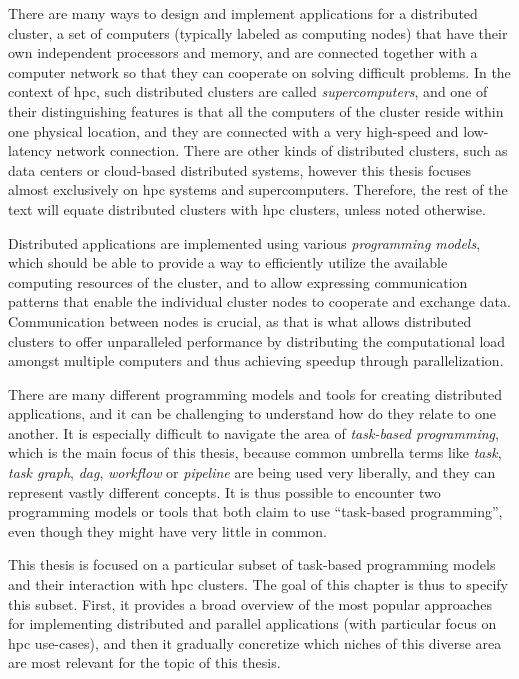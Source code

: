 There are many ways to design and implement applications for a distributed cluster, a set of
computers (typically labeled as computing nodes) that have their own independent processors and
memory, and are connected together with a computer network so that they can cooperate on solving
difficult problems. In the context of \gls{hpc}, such distributed clusters are called
\emph{supercomputers}, and one of their distinguishing features is that all the computers of the
cluster reside within one physical location, and they are connected with a very high-speed and
low-latency network connection. There are other kinds of distributed clusters, such as data centers
or cloud-based distributed systems, however this thesis focuses almost exclusively on
\gls{hpc} systems and supercomputers. Therefore, the rest of the text will equate
distributed clusters with \gls{hpc} clusters, unless noted otherwise.

Distributed applications are implemented using various \emph{programming models}, which should be able
to provide a way to efficiently utilize the available computing resources of the cluster, and to
allow expressing communication patterns that enable the individual cluster nodes to cooperate and
exchange data. Communication between nodes is crucial, as that is what allows distributed clusters
to offer unparalleled performance by distributing the computational load amongst multiple computers
and thus achieving speedup through parallelization.

There are many different programming models and tools for creating distributed applications, and it
can be challenging to understand how do they relate to one another. It is especially difficult to
navigate the area of \emph{task-based programming}, which is the main focus of this thesis, because common
umbrella terms like \emph{task}, \emph{task graph}, \emph{\gls{dag}},
\emph{workflow} or \emph{pipeline} are being used very liberally, and they can
represent vastly different concepts. It is thus possible to encounter two programming models or
tools that both claim to use ``task-based programming'', even though they might have very little in
common.

This thesis is focused on a particular subset of task-based programming models and their
interaction with \gls{hpc} clusters. The goal of this chapter is thus to specify this
subset. First, it provides a broad overview of the most popular approaches for implementing
distributed and parallel applications (with particular focus on \gls{hpc} use-cases),
and then it gradually concretize which niches of this diverse area are most relevant for the topic
of this thesis.

